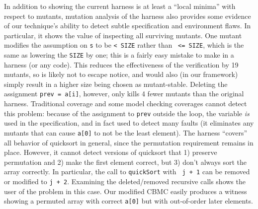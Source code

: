 \documentclass[conference]{IEEEtran}
\begin{document}
In addition to showing the current harness is at least a ``local
minima'' with respect to mutants, mutation analysis of the harness
also provides some evidence of our technique's ability to detect
subtle specification and environment flaws.  In particular, it shows
the value of inspecting all surviving mutants.  One mutant
modifies the assumption on {\tt s} to be {\tt < SIZE} rather than {\tt
  <= SIZE}, which is the same as lowering the {\tt SIZE} by one; this
is a fairly easy mistake to make in a harness (or any code).  This reduces the
effectiveness of the verification by 19 mutants, so is likely not to
escape notice, and would also (in our framework) simply result in a
higher size being chosen as mutant-stable.  Deleting the assignment
{\tt prev = a[i]}, however, only kills 4 fewer mutants than the
original harness.  Traditional coverage and some model checking coverages
cannot detect this problem: because of the assignment to {\tt prev}
outside the loop, the variable \emph{is} used in the specification, and in
fact used to detect many faults (it eliminates any mutants that can
cause {\tt a[0]} to not be the least element).  The harness ``covers'' all behavior of quicksort in general, since
the permutation requirement remains in place.  However, it cannot
detect versions of quicksort that 1) preserve permutation and 2) make
the first element correct, but 3) don't always sort the
array correctly.  In particular, the call to {\tt quickSort} with {\tt
  j + 1} can be removed or modified to {\tt j + 2}.
Examining the deleted/removed recursive calls shows the user of
the problem in this case.  Our modified CBMC easily produces a witness showing a permuted array with correct
{\tt a[0]} but with out-of-order later elements.
\end{document}
